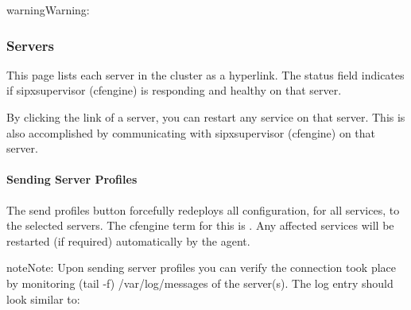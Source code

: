 \documentclass[letterpaper,10pt,english]{sphinxmanual}
\begin{document}
\begin{sphinxadmonition}{warning}{Warning:}
\end{sphinxadmonition}


\subsubsection{Servers}
\label{\detokenize{webui:id26}}
This page lists each server in the cluster as a hyperlink. The status field indicates if sipxsupervisor (cfengine) is responding and healthy on that server.


By clicking the link of a server, you can restart any service on that server. This is also accomplished by communicating with sipxsupervisor (cfengine) on that server.
\begin{quote}

\end{quote}


\paragraph{Sending Server Profiles}
\label{\detokenize{webui:sending-server-profiles}}\label{\detokenize{webui:id27}}
The send profiles button forcefully redeploys all configuration, for all services, to the selected servers.
The cfengine term for this is .
Any affected services will be restarted (if required) automatically by the agent.

\begin{sphinxadmonition}{note}{Note:}
Upon sending server profiles you can verify the connection took place by monitoring (tail -f) /var/log/messages of the server(s). The log entry should look similar to:

\begin{sphinxVerbatim}[commandchars=\\\{\}]
    \PYG{p}{[}\PYG{p}{]}    
\end{sphinxVerbatim}
\end{sphinxadmonition}
\end{document}
